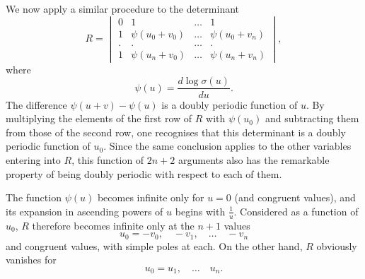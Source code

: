 \documentclass[12pt]{article}
\begin{document}
We now apply a similar procedure to the determinant
\begin{equation*}
R = \begin{vmatrix} 0 & 1 & \dots & 1 \\ 1 & \psi(u_0+v_0) & \dots & \psi(u_0+v_n) \\ . & . & \dots & . \\ 1 & \psi(u_n+v_0) & \dots & \psi(u_n+v_n) \end{vmatrix},
\end{equation*}
where
\begin{equation*}
\psi(u) = \frac{d\log\sigma(u)}{du}.
\end{equation*}
The difference $\psi(u+v) - \psi(u)$ is a doubly periodic function of $u$. By multiplying the elements of the first row of $R$ with $\psi(u_0)$ and subtracting them from those of the second row, one recognises that this determinant is a doubly periodic function of $u_0$. Since the same conclusion applies to the other variables entering into $R$, this function of $2n+2$ arguments also has the remarkable property of being doubly periodic with respect to each of them.

The function $\psi(u)$ becomes infinite only for $u = 0$ (and congruent values), and its expansion in ascending powers of $u$ begins with $\frac{1}{u}$.
Considered as a function of $u_0$, $R$ therefore becomes infinite only at the $n+1$ values
\begin{equation*}
u_0 = -v_0, \quad -v_1, \quad \dots \quad -v_n
\end{equation*}
and congruent values, with simple poles at each. On the other hand, $R$ obviously vanishes for
\begin{equation*}
u_0 = u_1, \quad \dots \quad u_n.
\end{equation*}
\end{document}

